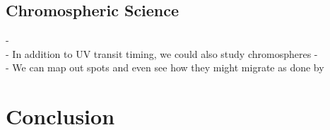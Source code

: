 \documentclass[manuscript]{aastex}
\begin{document}
\subsection{Chromospheric Science}
- \\
- In addition to UV transit timing, we could also study chromospheres
- \\
- We can map out spots and even see how they might migrate as done by \citet{2010arXiv1002.4113H}

\section{Conclusion}

\end{document}
